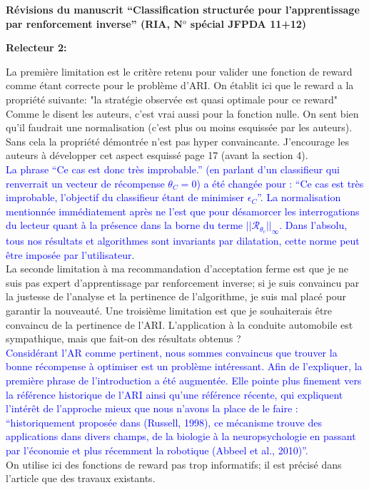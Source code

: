 \documentclass[11pt, a4paper]{letter}
\newcommand{\R}{\mathcal{R}}
\begin{document}
\begin{letter}{\large \textbf{Révisions du manuscrit ``Classification structurée pour l'apprentissage par renforcement inverse'' (RIA, N$^o$ spécial JFPDA 11+12)}}
\newpage
\begin{large} \textbf{Relecteur 2:} \\ \end{large}
La première limitation est le critère retenu pour valider une fonction de reward comme étant correcte pour le
problème d'ARI.
On établit ici que le reward a la propriété suivante:
"la stratégie observée est quasi optimale pour ce reward"
Comme le disent les auteurs, c'est vrai aussi pour la fonction nulle.
On sent bien qu'il faudrait une normalisation (c'est plus ou moins esquissée par les auteurs). Sans cela la  
propriété démontrée n'est pas hyper convaincante. J'encourage les auteurs à développer cet aspect esquissé page
17 (avant la section 4).\\
\textcolor{blue}{La phrase ``Ce cas est donc très improbable.'' (en parlant d'un classifieur qui renverrait un vecteur de récompense $\theta_C=0$) a été changée pour : ``Ce cas est très improbable, l'objectif du classifieur étant de minimiser $\epsilon_C$''. La normalisation mentionnée immédiatement après ne l'est que pour désamorcer les interrogations du lecteur quant à la présence dans la borne du terme $||\R_{\theta_c}||_\infty$. Dans l'absolu, tous nos résultats et algorithmes sont invariants par dilatation, cette norme peut être imposée par l'utilisateur.}\\
La seconde limitation à ma recommandation d'acceptation ferme est que je ne suis pas expert d'apprentissage par
renforcement inverse; si je suis convaincu par la justesse de l'analyse et la pertinence de l'algorithme, je suis mal
placé pour garantir la nouveauté.
Une troisième limitation est que je souhaiterais être convaincu de la pertinence de l'ARI. L'application à la conduite automobile est sympathique, mais que fait-on des résultats obtenus ?\\
  \textcolor{blue}{Considérant l'AR comme pertinent, nous sommes convaincus que trouver la bonne récompense à optimiser est un problème intéressant. Afin de l'expliquer, la première phrase de l'introduction a été augmentée. Elle pointe plus finement vers la référence historique de l'ARI ainsi qu'une référence récente, qui expliquent l'intérêt de l'approche mieux que nous n'avons la place de le faire : ``historiquement proposée dans (Russell, 1998),
ce mécanisme trouve des applications dans divers champs, de la biologie à la neuropsychologie en passant par l’économie et plus récemment la robotique (Abbeel et al., 2010)''.}\\
On utilise ici des fonctions de reward pas trop informatifs; il est précisé dans l'article que des travaux existants.

\end{letter}
\end{document}
